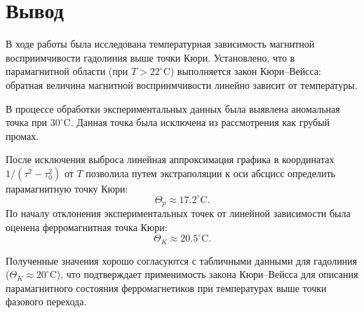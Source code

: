 \documentclass[a4paper,10pt]{article}
\begin{document}
\section{Вывод}
В ходе работы была исследована температурная зависимость магнитной восприимчивости гадолиния выше точки Кюри. Установлено, что в парамагнитной области (при \(T > 22^\circ\text{C}\)) выполняется закон Кюри--Вейсса: обратная величина магнитной восприимчивости линейно зависит от температуры.

В процессе обработки экспериментальных данных была выявлена аномальная точка при \(30^\circ\text{C}\). Данная точка была исключена из рассмотрения как грубый промах. 

После исключения выброса линейная аппроксимация графика в координатах \(1/(\tau^2 - \tau_0^2)\) от \(T\) позволила путем экстраполяции к оси абсцисс определить парамагнитную точку Кюри:
\[
\Theta_p \approx 17.2^\circ\text{C}.
\]
По началу отклонения экспериментальных точек от линейной зависимости была оценена ферромагнитная точка Кюри:
\[
\Theta_K \approx 20.5^\circ\text{C}.
\]

Полученные значения хорошо согласуются с табличными данными для гадолиния (\(\Theta_K \approx 20^\circ\text{C}\)), что подтверждает применимость закона Кюри--Вейсса для описания парамагнитного состояния ферромагнетиков при температурах выше точки фазового перехода.
\end{document}
